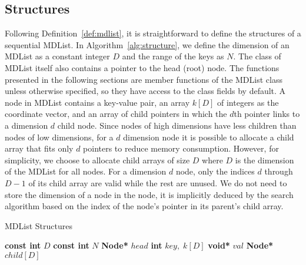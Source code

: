 \documentclass[10pt,journal,letterpaper,compsoc]{IEEEtran}
\begin{document}


\subsection{Structures}
Following Definition~\ref{def:mdlist}, it is straightforward to define the structures of a sequential MDList.
In Algorithm~\ref{alg:structure}, we define the dimension of an MDList as a constant integer $D$ and the range of the keys as $N$.
The class of MDList itself also contains a pointer to the head (root) node.
The functions presented in the following sections are member functions of the MDList class unless otherwise specified, so they have access to the class fields by default.
A node in MDList contains a key-value pair, an array $k[D]$ of integers as the coordinate vector, and an array of child pointers in which the $d$th pointer links to a dimension $d$ child node.
Since nodes of high dimensions have less children than nodes of low dimensions, for a $d$ dimension node it is possible to allocate a child array that fits only $d$ pointers to reduce memory consumption. 
However, for simplicity, we choose to allocate child arrays of size $D$ where $D$ is the dimension of the MDList for all nodes. 
For a dimension $d$ node, only the indices $d$ through $D-1$ of its child array are valid while the rest are unused.
We do not need to store the dimension of a node in the node, it is implicitly deduced by the search algorithm based on the index of the node's pointer in its parent's child array.
\begin{algorithm}[ht]
    \caption{MDList Structures}
    \label{alg:structure}
    \vspace{-0.1in}
    \begin{multicols}{2}
        \begin{algorithmic}[1]
            \State \textbf{const int} $D$
            \State \textbf{const int} $N$
            \State \textbf{Node*} $head$
            \EndClass
            \State \textbf{int} $key,\;k[D]$
            \State \textbf{void*} $val$
            \State \textbf{Node*} $child[D]$
            \EndStruct
        \end{algorithmic}
    \end{multicols}
    \vspace{-0.1in}
\end{algorithm}
\end{document}
